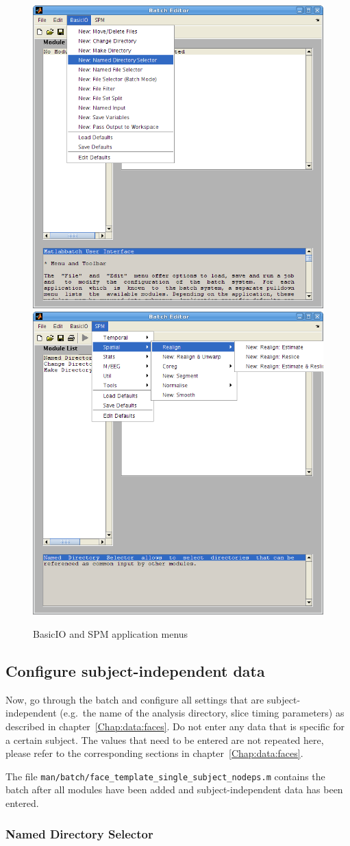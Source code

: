 \begin{figure}
  \centering
  \includegraphics[width=.49\linewidth]{batch/batch_basicio}
  \hfill
  \includegraphics[width=.49\linewidth]{batch/batch_spm}      
  \caption{BasicIO and SPM application menus}
  \label{fig:basicio_spm}
\end{figure}

\subsection{Configure subject-independent data}

Now, go through the batch and configure all settings that are
subject-independent (e.g.\ the name of the analysis directory, slice timing
parameters) as described in chapter~\ref{Chap:data:faces}. Do not enter any data that
is specific for a certain subject. The values that need to be entered are not
repeated here, please refer to the corresponding sections in
chapter~\ref{Chap:data:faces}.

The file \verb|man/batch/face_template_single_subject_nodeps.m| contains the
batch after all modules have been added and subject-independent data has been
entered.

\subsubsection*{Named Directory Selector}

